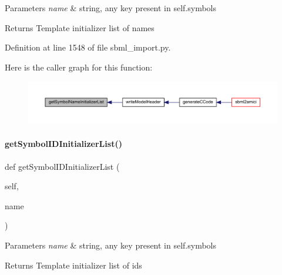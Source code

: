 \begin{DoxyParams}{Parameters}
{\em name} & string, any key present in self.\+symbols\\
\hline
\end{DoxyParams}
\begin{DoxyReturn}{Returns}
Template initializer list of names 
\end{DoxyReturn}


Definition at line 1548 of file sbml\+\_\+import.\+py.

Here is the caller graph for this function\+:
\nopagebreak
\begin{figure}[H]
\begin{center}
\leavevmode
\includegraphics[width=350pt]{classamici_1_1sbml__import_1_1_sbml_importer_a1280dbd6e4ab980a25798bf8d88670b9_icgraph}
\end{center}
\end{figure}
\mbox{\label{classamici_1_1sbml__import_1_1_sbml_importer_ae0027a630db3a61e19be3dfeaa166304}} 
\paragraph{\texorpdfstring{get\+Symbol\+I\+D\+Initializer\+List()}{getSymbolIDInitializerList()}}
{\footnotesize\ttfamily def get\+Symbol\+I\+D\+Initializer\+List (\begin{DoxyParamCaption}\item[{}]{self,  }\item[{}]{name }\end{DoxyParamCaption})}


\begin{DoxyParams}{Parameters}
{\em name} & string, any key present in self.\+symbols\\
\hline
\end{DoxyParams}
\begin{DoxyReturn}{Returns}
Template initializer list of ids 
\end{DoxyReturn}


